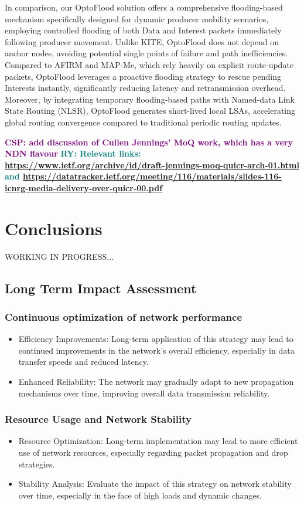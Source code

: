 \documentclass[10pt,conference]{IEEEtran}
\newcommand{\csp}[1]{\textbf{\textcolor{purple}{CSP: #1}}}
\newcommand{\ryo}[1]{\textbf{\textcolor{teal}{RY: #1}}}
\begin{document}
In comparison, our OptoFlood solution offers a comprehensive flooding-based mechanism specifically designed for dynamic producer mobility scenarios, employing controlled flooding of both Data and Interest packets immediately following producer movement. Unlike KITE, OptoFlood does not depend on anchor nodes, avoiding potential single points of failure and path inefficiencies. Compared to AFIRM and MAP-Me, which rely heavily on explicit route-update packets, OptoFlood leverages a proactive flooding strategy to rescue pending Interests instantly, significantly reducing latency and retransmission overhead. Moreover, by integrating temporary flooding-based paths with Named-data Link State Routing (NLSR), OptoFlood generates short-lived local LSAs, accelerating global routing convergence compared to traditional periodic routing updates.

\csp{add discussion of Cullen Jennings' MoQ work, which has a very NDN flavour}
\ryo{Relevant links: \url{https://www.ietf.org/archive/id/draft-jennings-moq-quicr-arch-01.html} and \url{https://datatracker.ietf.org/meeting/116/materials/slides-116-icnrg-media-delivery-over-quicr-00.pdf}}

\section{Conclusions}
\label{sec:conclusion}

WORKING IN PROGRESS...
\subsection{Long Term Impact Assessment}
\subsubsection{Continuous optimization of network performance}
\begin{itemize}
    \item Efficiency Improvements: Long-term application of this strategy may lead to continued improvements in the network's overall efficiency, especially in data transfer speeds and reduced latency.
    \item Enhanced Reliability: The network may gradually adapt to new propagation mechanisms over time, improving overall data transmission reliability.
\end{itemize}

\subsubsection{Resource Usage and Network Stability}
\begin{itemize}
    \item Resource Optimization: Long-term implementation may lead to more efficient use of network resources, especially regarding packet propagation and drop strategies.
    \item Stability Analysis: Evaluate the impact of this strategy on network stability over time, especially in the face of high loads and dynamic changes.
\end{itemize}
\end{document}
